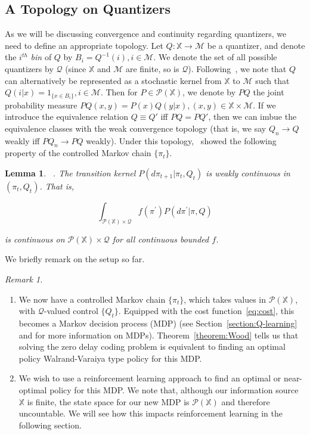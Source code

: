 \documentclass[conference, draftcls, onecolumn]{IEEEtran}
\newtheorem{lemma}{Lemma}
\begin{document}
\subsection{A Topology on Quantizers}
As we will be discussing convergence and continuity regarding quantizers, we need to define an appropriate topology. Let \( Q : \mathbb{X} \to \mathcal{M}\) be a quantizer, and denote the \( i^{th} \) \emph{bin} of \( Q \) by \( B_i = Q^{-1}(i), i \in \mathcal{M} \). We denote the set of all possible quantizers by \( \mathcal{Q} \) (since \(\mathbb{X}\) and \(\mathcal{M}\) are finite, so is \(\mathcal{Q}\)). Following~\cite{YukselOptimizationofChannels,Linder}, we note that \(Q\) can alternatively be represented as a stochastic kernel from \( \mathbb{X} \) to \( \mathcal{M} \) such that \( Q(i|x) = 1_{\{x \in B_i\}}, i \in \mathcal{M} \). Then for \( P \in \mathcal{P}(\mathbb{X}) \), we denote by \( PQ \) the joint probability measure \( PQ(x,y) = P(x)Q(y|x), (x,y) \in \mathbb{X} \times \mathcal{M} \). If we introduce the equivalence relation \( Q \equiv Q' \) iff \( PQ = PQ' \), then we can imbue the equivalence classes with the weak convergence topology (that is, we say \( Q_n \to Q \) weakly iff \( PQ_n \to PQ \) weakly). Under this topology,~\cite{Linder} showed the following property of the controlled Markov chain \( \{\pi_t\} \).

\begin{lemma}\label{lemma:weak}~\cite[Lemma 11]{Linder}.
    The transition kernel \( P(d\pi_{t+1}|\pi_t,Q_t) \) is weakly continuous in \( (\pi_t,Q_t) \). That is,

    \[ \int_{\mathcal{P}(\mathbb{X}) \times \mathcal{Q}} f(\pi^{'})P(d \pi^{'}|\pi, Q) \]

    is continuous on \( \mathcal{P}(\mathbb{X}) \times \mathcal{Q} \) for all continuous bounded \(f\).
\end{lemma}

\noindent We briefly remark on the setup so far.
\vspace{1em}

\noindent\emph{Remark 1.}\label{remark:1}
\begin{enumerate}[wide, labelwidth=!, labelindent=0pt]
    \item We now have a controlled Markov chain \(\{\pi_t\}\), which takes values in \(\mathcal{P}(\mathbb{X})\), with \(\mathcal{Q}\)-valued control \(\{Q_t\}\). Equipped with the cost function~\eqref{eq:cost}, this becomes a Markov decision process (MDP) (see Section~\ref{section:Q-learning} and \cite{Lerma} for more information on MDPs). Theorem~\ref{theorem:Wood} tells us that solving the zero delay coding problem is equivalent to finding an optimal policy Walrand-Varaiya type policy for this MDP.
    \item We wish to use a reinforcement learning approach to find an optimal or near-optimal policy for this MDP. We note that, although our information source \(\mathbb{X}\) is finite, the state space for our new MDP is \(\mathcal{P}(\mathbb{X})\) and therefore uncountable. We will see how this impacts reinforcement learning in the following section.
\end{enumerate}
\end{document}
